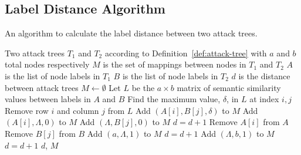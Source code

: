 \subsection{Label Distance Algorithm}
\label{appendix:alg:label-distance}
\begin{algorithm}[H]
    \caption{An algorithm to calculate the label distance between two attack trees.}
    \label{alg:label-distance}
    \begin{algorithmic}
        \State Two attack trees $T_1$ and $T_2$ according to Definition~\ref{def:attack-tree} with $a$ and $b$ total nodes respectively
        \State $M$ is the set of mappings between nodes in $T_1$ and $T_2$
        \State $A$ is the list of node labels in $T_1$
        \State $B$ is the list of node labels in $T_2$
        \State $d$ is the distance between attack trees
        \State $M \gets \emptyset$
        \State Let $L$ be the $a \times b$ matrix of semantic similarity values between labels in $A$ and $B$
        \State Find the maximum value, $\delta$, in $L$ at index $i, j$
        \State Remove row $i$ and column $j$ from $L$
        \If{$\delta > \epsilon$}
        \State Add $(A[i], B[j], \delta)$ to $M$
        \Else
        \State Add $(A[i], \Lambda, 0)$ to $M$
        \State Add $(\Lambda, B[j], 0)$ to $M$
        \State $d = d + 1$
        \EndIf
        \State Remove $A[i]$ from $A$
        \State Remove $B[j]$ from $B$
        \EndWhile
        \State Add $(a, \Lambda, 1)$ to $M$
        \State $d = d + 1$
        \EndFor
        \State Add $(\Lambda, b, 1)$ to $M$
        \State $d = d + 1$
        \EndFor
        \State \Return $d$, $M$
    \end{algorithmic}
\end{algorithm}


